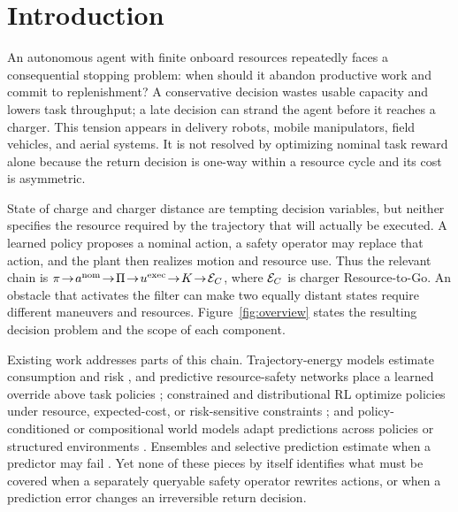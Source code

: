 \section{Introduction}
\label{sec:intro}

An autonomous agent with finite onboard resources repeatedly faces a consequential stopping problem: when should it abandon productive work and commit to replenishment? A conservative decision wastes usable capacity and lowers task throughput; a late decision can strand the agent before it reaches a charger. This tension appears in delivery robots, mobile manipulators, field vehicles, and aerial systems. It is not resolved by optimizing nominal task reward alone because the return decision is one-way within a resource cycle and its cost is asymmetric.

\begin{center}
  \centering
  \resizebox{0.98\linewidth}{!}{}
  \label{fig:overview}
\end{center}

State of charge and charger distance are tempting decision variables, but neither specifies the resource required by the trajectory that will actually be executed. A learned policy proposes a nominal action, a safety operator may replace that action, and the plant then realizes motion and resource use. Thus the relevant chain is
\(
\pi\!\to\! a^{\mathrm{nom}}\!\to\!\Pi\!\to\!u^{\mathrm{exec}}\!\to\!K\!\to\!\RtoGo
\),
where \(\mathcal{E}_{C}\) is charger Resource-to-Go. An obstacle that activates the filter can make two equally distant states require different maneuvers and resources. Figure~\ref{fig:overview} states the resulting decision problem and the scope of each component.

Existing work addresses parts of this chain. Trajectory-energy models estimate consumption and risk \citep{choudhry2021cvar}, and predictive resource-safety networks place a learned override above task policies \citep{guo2020predictive}; constrained and distributional RL optimize policies under resource, expected-cost, or risk-sensitive constraints \citep{qin2021density,achiam2017cpo,liu2022cvpo,kim2023sdac}; and policy-conditioned or compositional world models adapt predictions across policies or structured environments \citep{chen2024pcm,zhao2022howm,wang2025wm3c}. Ensembles and selective prediction estimate when a predictor may fail \citep{lakshminarayanan2017ensembles,geifman2019selectivenet}. Yet none of these pieces by itself identifies what must be covered when a separately queryable safety operator rewrites actions, or when a prediction error changes an irreversible return decision.

